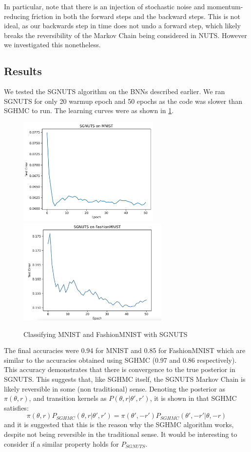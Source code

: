 In particular, note that there is an injection of stochastic noise and momentum-reducing friction in both the forward steps and the backward steps. This is not ideal, as our backwards step in time does not undo a forward step, which likely breaks the reversibility of the Markov Chain being considered in NUTS. However we investigated this nonetheless.


\subsection{Results} 

We tested the SGNUTS algorithm on the BNNs described earlier. We ran SGNUTS for only 20 warmup epoch and 50 epochs as the code was slower than SGHMC to run. The learning curves were as shown in \cref{SGNUTS_results}.

\begin{figure}[h!]
\centering
\includegraphics[width=70mm]{parts/Images/SGNUTS_MNIST.png}
\includegraphics[width=75mm]{parts/Images/SGNUTS_Fashion.png}
\caption{Classifying MNIST and FashionMNIST with SGNUTS}
\label{SGNUTS_results}
\end{figure}

The final accuracies were 0.94 for MNIST and 0.85 for FashionMNIST which are similar to the accuracies obtained using SGHMC (0.97 and 0.86 respectively). This accuracy demonstrates that there is convergence to the true posterior in SGNUTS. This suggests that, like SGHMC itself, the SGNUTS Markov Chain is likely reversible in some (non traditional) sense. Denoting the posterior as $\pi(\theta, r)$, and transition kernels as $P(\theta, r| \theta', r')$, it is shown in \cite{sghmc} that SGHMC satisfies:
$$ \pi(\theta,r)P_{SGHMC}(\theta,r|\theta',r') = \pi(\theta',-r')P_{SGHMC}(\theta',-r'|\theta,-r)$$
and it is suggested that this is the reason why the SGHMC algorithm works, despite not being reversible in the traditional sense. It would be interesting to consider if a similar property holds for $P_{SGNUTS}$.


